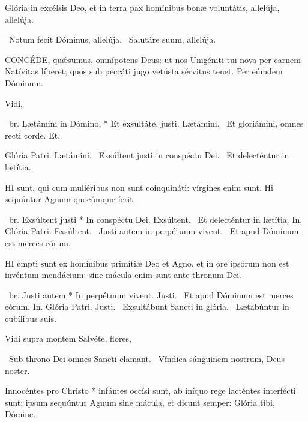 
 Glória in excélsis Deo, et in terra pax homínibus bonæ voluntátis, allelúja, allelúja.

\V\ Notum fecit Dóminus, allelúja. \R\ Salutáre suum, allelúja.


\lettrine[lines=2]{C}{ONCÉDE}, quǽsumus, omnípotens Deus: ut nos Unigéniti tui nova per carnem Natívitas líberet; quos sub peccáti jugo vetústa sérvitus tenet. Per eúmdem Dóminum.


 Vidi, 

\R\ br. Lætámini in Dómino, * Et exsultáte, justi. Lætámini. \V\ Et gloriámini, omnes recti corde. Et.

Glória Patri. Lætámini. \V\ Exsúltent justi in conspéctu Dei. \R\ Et delecténtur in lætítia.



\lettrine[lines=2]{H}{I} sunt, qui cum muliéribus non sunt coinquináti: vírgines enim sunt. Hi sequúntur Agnum quocúmque íerit.

\R\ br. Exsúltent justi * In conspéctu Dei. Exsúltent. \V\ Et delecténtur in lætítia. In. Glória Patri. Exsúltent. \V\ Justi autem in perpétuum vivent. \R\ Et apud Dóminum est merces eórum.



\lettrine[lines=2]{H}{I} empti sunt ex homínibus primítiæ Deo et Agno, et in ore ipsórum non est invéntum mendácium: sine mácula enim sunt ante thronum Dei.

\R\ br. Justi autem * In perpétuum vivent. Justi. \V\ Et apud Dóminum est merces eórum. In. Glória Patri. Justi. \V\ Exsultábunt Sancti in glória. \R\ Lætabúntur in cubílibus suis.



 Vidi supra montem  Salvéte, flores, 

\V\ Sub throno Dei omnes Sancti clamant. \R\ Víndica sánguinem nostrum, Deus noster.

 Innocéntes pro Christo * infántes occísi sunt, ab iníquo rege lacténtes interfécti sunt; ipsum sequúntur Agnum sine mácula, et dicunt semper: Glória tibi, Dómine.

